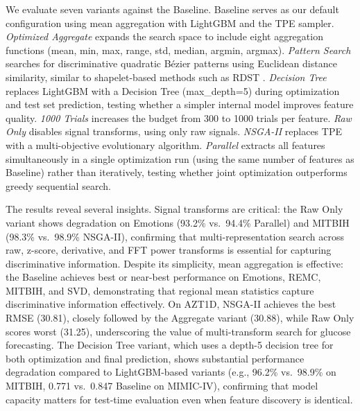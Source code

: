 \documentclass[times, review, 10pt]{elsarticle}
\begin{document}
We evaluate seven variants against the Baseline. Baseline serves as our default configuration using mean aggregation with LightGBM and the TPE sampler.
\emph{Optimized Aggregate} expands the search space to include eight aggregation functions (mean, min, max, range, std, median, argmin, argmax). 
\emph{Pattern Search} searches for discriminative quadratic B\'ezier patterns using Euclidean distance similarity, similar to shapelet-based methods such as RDST \cite{guillaume2022random}.
\emph{Decision Tree} replaces LightGBM with a Decision Tree (max\_depth=5) during optimization and test set prediction, testing whether a simpler internal model improves feature quality. 
\emph{1000 Trials} increases the budget from 300 to 1000 trials per feature.
\emph{Raw Only} disables signal transforms, using only raw signals. \emph{NSGA-II} replaces TPE with a multi-objective evolutionary algorithm. 
\emph{Parallel} extracts all features simultaneously in a single optimization run (using the same number of features as Baseline) rather than iteratively, 
testing whether joint optimization outperforms greedy sequential search.

\begin{table}[H]
\centering
\caption{Ablation study across seven datasets (single fold;
Baseline scores may differ slightly from the multi-fold
averages in Table~\ref{tab:results}). Bold indicates best
score per dataset. Arrows indicate optimization direction
($\uparrow$ higher better, $\downarrow$ lower better).
Rows show metric, number of extracted features, and
runtime (s).}

\end{table}

The results reveal several insights. Signal transforms are
critical: the Raw Only variant shows degradation on Emotions
(93.2\% vs.\ 94.4\% Parallel) and MITBIH (98.3\% vs.\
98.9\% NSGA-II), confirming that multi-representation
search across raw, z-score, derivative, and FFT power
transforms is essential for capturing discriminative
information. Despite its simplicity, mean aggregation is
effective: the Baseline achieves best or near-best
performance on Emotions, REMC, MITBIH, and SVD,
demonstrating that regional mean statistics capture
discriminative information effectively.
On AZT1D, NSGA-II achieves the best RMSE (30.81),
closely followed by the Aggregate variant (30.88),
while Raw Only scores worst (31.25), underscoring
the value of multi-transform search for glucose
forecasting.
The Decision Tree variant, which uses a depth-5 decision
tree for both optimization and final prediction, shows
substantial performance degradation compared to
LightGBM-based variants (e.g., 96.2\% vs.\ 98.9\% on
MITBIH, 0.771 vs.\ 0.847 Baseline on MIMIC-IV),
confirming that model capacity matters for test-time
evaluation even when feature discovery is identical.
\end{document}
